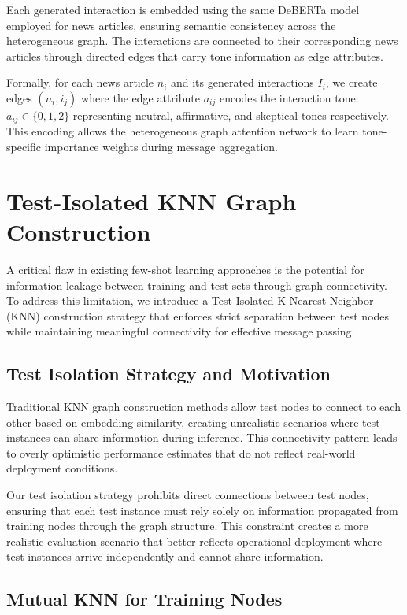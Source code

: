 Each generated interaction is embedded using the same DeBERTa model employed for news articles, ensuring semantic consistency across the heterogeneous graph. The interactions are connected to their corresponding news articles through directed edges that carry tone information as edge attributes.

Formally, for each news article $n_i$ and its generated interactions $I_i$, we create edges $(n_i, i_j)$ where the edge attribute $a_{ij}$ encodes the interaction tone: $a_{ij} \in \{0, 1, 2\}$ representing neutral, affirmative, and skeptical tones respectively. This encoding allows the heterogeneous graph attention network to learn tone-specific importance weights during message aggregation.

\section{Test-Isolated KNN Graph Construction}

A critical flaw in existing few-shot learning approaches is the potential for information leakage between training and test sets through graph connectivity. To address this limitation, we introduce a Test-Isolated K-Nearest Neighbor (KNN) construction strategy that enforces strict separation between test nodes while maintaining meaningful connectivity for effective message passing.

\subsection{Test Isolation Strategy and Motivation}

Traditional KNN graph construction methods allow test nodes to connect to each other based on embedding similarity, creating unrealistic scenarios where test instances can share information during inference. This connectivity pattern leads to overly optimistic performance estimates that do not reflect real-world deployment conditions.

Our test isolation strategy prohibits direct connections between test nodes, ensuring that each test instance must rely solely on information propagated from training nodes through the graph structure. This constraint creates a more realistic evaluation scenario that better reflects operational deployment where test instances arrive independently and cannot share information.

\subsection{Mutual KNN for Training Nodes}


